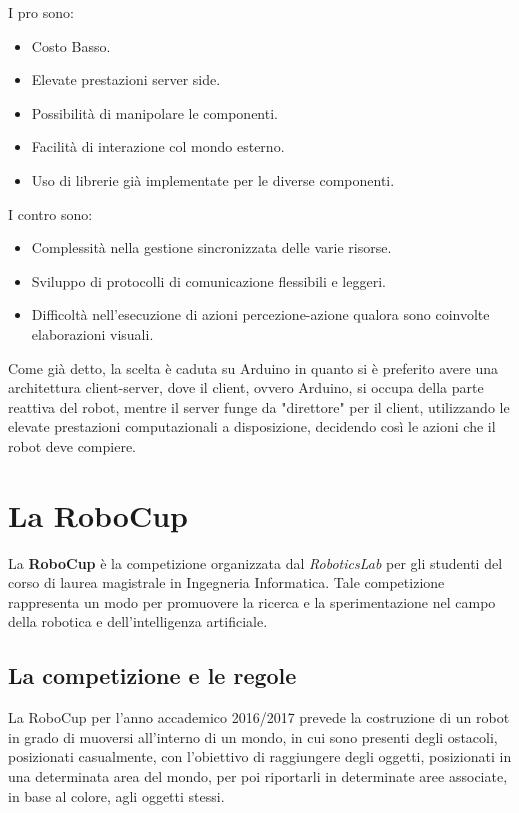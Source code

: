 \documentclass[a4paper,12pt,italian]{article}
\begin{document}
I pro sono:
\begin{itemize}
	\item Costo Basso.
	\item Elevate prestazioni server side. 
	\item Possibilità di manipolare le componenti. 
	\item Facilità di interazione col mondo esterno. 
	\item Uso di librerie già implementate per le diverse componenti. 
\end{itemize}

I contro sono:
\begin{itemize}
	\item Complessità nella gestione sincronizzata delle varie risorse.
	\item Sviluppo di protocolli di comunicazione flessibili e leggeri.
	\item Difficoltà nell’esecuzione di azioni percezione-azione qualora sono coinvolte elaborazioni visuali. 
\end{itemize}

Come già detto, la scelta è caduta su Arduino in quanto si è preferito avere una architettura client-server, dove il client, ovvero Arduino, si occupa della parte reattiva del robot, mentre il server funge da "direttore" per il client, utilizzando le elevate prestazioni computazionali a disposizione, decidendo così le azioni che il robot deve compiere.

\pagebreak
\section{La RoboCup}

La \textbf{RoboCup} è la competizione organizzata dal \textit{RoboticsLab} per gli studenti del corso di laurea magistrale in Ingegneria Informatica. Tale competizione rappresenta un modo per promuovere la ricerca e la sperimentazione nel campo della robotica e dell'intelligenza artificiale. 


\subsection{La competizione e le regole}

La RoboCup per l'anno accademico 2016/2017 prevede la costruzione di un robot in grado di muoversi all'interno di un mondo, in cui sono presenti degli ostacoli, posizionati casualmente, con l'obiettivo di raggiungere degli oggetti, posizionati in una determinata area del mondo, per poi riportarli in determinate aree associate, in base al colore, agli oggetti stessi.
\end{document}
